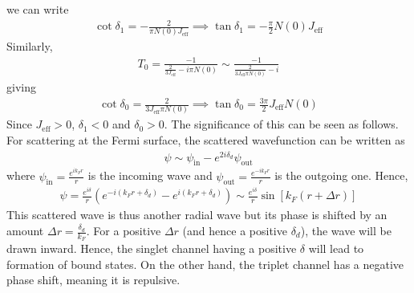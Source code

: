 \documentclass[twoside]{report}
\numberwithin{equation}{section}
\begin{document}
we can write
\begin{equation}\begin{aligned}
\cot \delta_1 = -\frac{2}{\pi N(0) J_\text{eff}}\implies \tan \delta_1 = -\frac{\pi}{2} N(0) J_\text{eff}
\end{aligned}\end{equation} 
Similarly,
\begin{equation}\begin{aligned}
T_0 =  \frac{-1}{\frac{2}{3 J_\text{eff}} - i\pi N(0)} \sim \frac{-1}{\frac{2}{3 J_\text{eff} \pi N(0)} - i}
\end{aligned}\end{equation}
giving
\begin{equation}\begin{aligned}
\cot \delta_0 = \frac{2}{3 J_\text{eff} \pi N(0)} \implies \tan \delta_0 = \frac{3\pi}{2} J_\text{eff} N(0)
\end{aligned}\end{equation}
Since \(J_\text{eff} > 0\), \(\delta_1 < 0\) and \(\delta_0 > 0\).
The significance of this can be seen as follows.
For scattering at the Fermi surface, the scattered wavefunction can be written as
\begin{equation}\begin{aligned}
\psi \sim \psi_\text{in} - e^{2 i \delta_d} \psi_\text{out}
\end{aligned}\end{equation}
where \(\psi_\text{in} = \frac{e^{ik_F r}}{r}\) is the incoming wave and \(\psi_\text{out} = \frac{e^{-ik_F r}}{r}\) is the outgoing one.
Hence,
\begin{equation}\begin{aligned}
	\psi = \frac{e^{i \delta}}{r} \left(e^{-i\left(k_Fr + \delta_d\right)} - e^{i\left(k_Fr + \delta_d\right)}\right) \sim \frac{e^{i \delta}}{r} \sin \left[k_F\left(r + \Delta r\right)\right]
\end{aligned}\end{equation}
This scattered wave is thus another radial wave but its phase is shifted by an amount \(\Delta r = \frac{\delta_d}{k_F}\).
For a positive \(\Delta r\) (and hence a positive \(\delta_d\)), the wave will be drawn inward.
Hence, the singlet channel having a positive \(\delta\) will lead to formation of bound states.
On the  other hand, the triplet channel has a negative phase shift, meaning it is repulsive.
\end{document}
